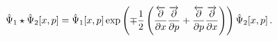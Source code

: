 \begin{equation}
{\hat{\Psi}}_{1}\star {\hat{\Psi}}_{2}[x,p]={\hat{\Psi}}_{1}[x,p]\exp \left(
\mp {\frac{1}{2}}\left( {\frac{\overleftarrow{\partial }}{\partial x}}{\frac{%
\overrightarrow{\partial }}{\partial p}}+{\frac{\overleftarrow{\partial }}{%
\partial p}}{\frac{\overrightarrow{\partial }}{\partial x}}\right) \right) {%
\hat{\Psi}}_{2}[x,p]\,.  \label{eq:anti-Moyal}
\end{equation}

